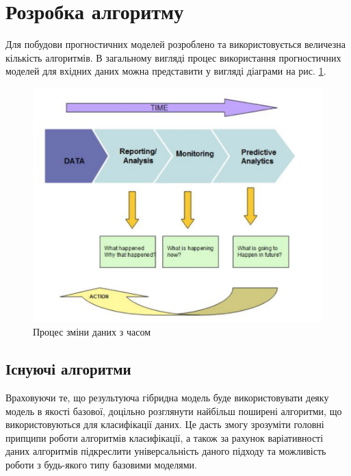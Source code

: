 \section{Розробка алгоритму}

Для побудови прогностичних моделей розроблено та використовується величезна кількість алгоритмів. В загальному вигляді процес використання прогностичних моделей для вхідних даних можна представити у вигляді діаграми на рис. \ref{fig:data_process}.

\begin{figure}[h!]
  \includegraphics[width=\linewidth]{figures/data_process.png}
  \caption{Процес зміни даних з часом}
  \label{fig:data_process}
\end{figure}

\subsection{Існуючі алгоритми}
Враховуючи те, що результуюча гібридна модель буде використовувати деяку модель в якості базової, доцільно розглянути найбільш поширені алгоритми, що використовуються для класифікації даних. Це дасть змогу зрозуміти головні припципи роботи алгоритмів класифікації, а також за рахунок варіативності даних алгоритмів підкреслити універсальність даного підходу та можливість роботи з будь-якого типу базовими моделями.

